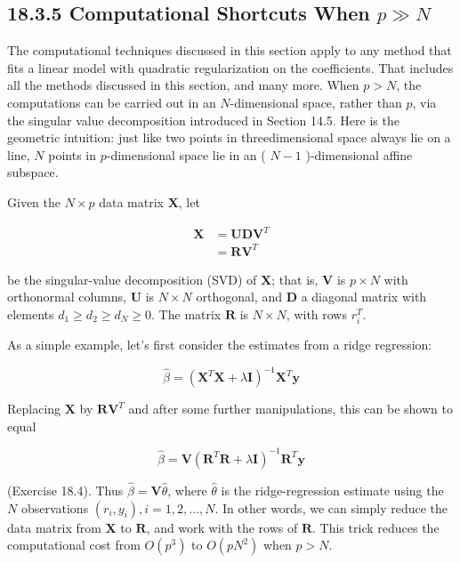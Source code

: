 \documentclass[10pt]{article}
\begin{document}
\subsection*{18.3.5 Computational Shortcuts When $p \gg N$}
The computational techniques discussed in this section apply to any method that fits a linear model with quadratic regularization on the coefficients. That includes all the methods discussed in this section, and many more. When $p>N$, the computations can be carried out in an $N$-dimensional space, rather than $p$, via the singular value decomposition introduced in Section 14.5. Here is the geometric intuition: just like two points in threedimensional space always lie on a line, $N$ points in $p$-dimensional space lie in an ( $N-1$ )-dimensional affine subspace.

Given the $N \times p$ data matrix $\mathbf{X}$, let


\begin{align*}
\mathbf{X} & =\mathbf{U D V}^{T}  \tag{18.12}\\
& =\mathbf{R V}^{T} \tag{18.13}
\end{align*}


be the singular-value decomposition (SVD) of $\mathbf{X}$; that is, $\mathbf{V}$ is $p \times N$ with orthonormal columns, $\mathbf{U}$ is $N \times N$ orthogonal, and $\mathbf{D}$ a diagonal matrix with elements $d_{1} \geq d_{2} \geq d_{N} \geq 0$. The matrix $\mathbf{R}$ is $N \times N$, with rows $r_{i}^{T}$.

As a simple example, let's first consider the estimates from a ridge regression:


\begin{equation*}
\hat{\beta}=\left(\mathbf{X}^{T} \mathbf{X}+\lambda \mathbf{I}\right)^{-1} \mathbf{X}^{T} \mathbf{y} \tag{18.14}
\end{equation*}


Replacing $\mathbf{X}$ by $\mathbf{R V}^{T}$ and after some further manipulations, this can be shown to equal


\begin{equation*}
\hat{\beta}=\mathbf{V}\left(\mathbf{R}^{T} \mathbf{R}+\lambda \mathbf{I}\right)^{-1} \mathbf{R}^{T} \mathbf{y} \tag{18.15}
\end{equation*}


(Exercise 18.4). Thus $\hat{\beta}=\mathbf{V} \hat{\theta}$, where $\hat{\theta}$ is the ridge-regression estimate using the $N$ observations $\left(r_{i}, y_{i}\right), i=1,2, \ldots, N$. In other words, we can simply reduce the data matrix from $\mathbf{X}$ to $\mathbf{R}$, and work with the rows of $\mathbf{R}$. This trick reduces the computational cost from $O\left(p^{3}\right)$ to $O\left(p N^{2}\right)$ when $p>N$.
\end{document}
